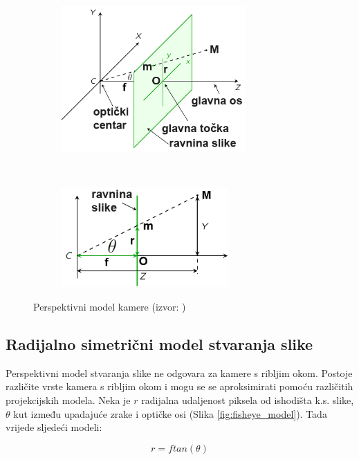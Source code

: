 \documentclass[../seminar.tex]{subfiles}
\begin{document}
\begin{figure}[ht!]
    \centering
    \begin{subfigure}[t]{0.5\textwidth}
        \centering
        \includegraphics[height=2.2in]{pinhole_camera_model_01.png}
    \end{subfigure}%
    ~ 
    \begin{subfigure}[t]{0.5\textwidth}
        \centering
        \includegraphics[height=1.5in]{pinhole_camera_model_02.png}
    \end{subfigure}
    \caption{Perspektivni model kamere (izvor: \cite{Chemnitz:Pinhole})}
    \label{fig:perspektivni_model}
\end{figure}

\clearpage

\subsection{Radijalno simetrični model stvaranja slike}

Perspektivni model stvaranja slike ne odgovara za kamere s ribljim okom. 
Postoje različite vrste kamera s ribljim okom i mogu se se aproksimirati 
pomoću različitih projekcijskih modela. Neka je $r$ radijalna udaljenost piksela od ishodišta k.s. slike, 
$\theta$ kut između upadajuće zrake i optičke osi (Slika \ref{fig:fisheye_model}).
Tada vrijede sljedeći modeli:

\begin{equation}
\label{eq: persp}
r = f tan(\theta)
\end{equation}
\end{document}
